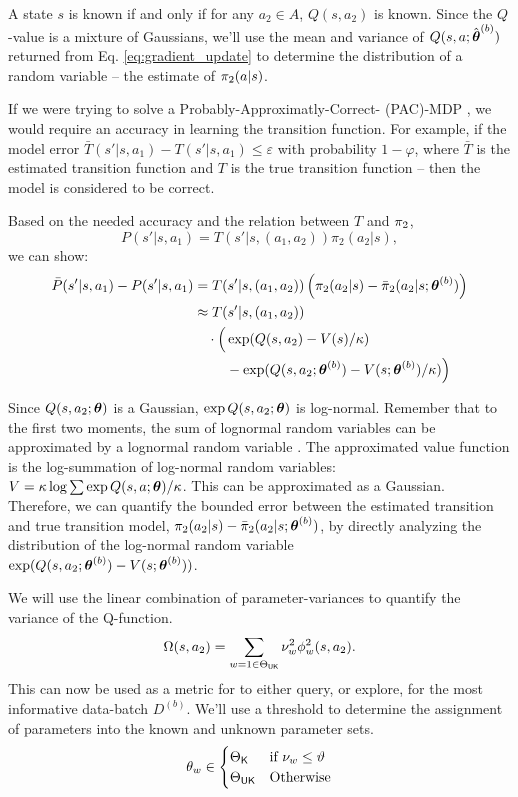 A state $s$ is known if and only if for any $a_2 \in A$, $Q(s,a_2)$ is known. Since the $Q$-value is a mixture of
Gaussians, we'll use the mean and variance of $Q(s,a;\hat{\boldsymbol{\mathbb{\theta}}}^{(b)})$ returned from Eq.
\ref{eq:gradient_update} to determine the distribution of a random variable -- the estimate of $\pi_{2}(a|s)$.

If we were trying to solve a Probably-Approximatly-Correct- (PAC)-MDP \cite{Fu-RSS-14}, we would require an accuracy
in learning the transition function. For example, if the model error $\bar T(s'|s,a_1) - T(s'|s,a_1) \le
\varepsilon$ with probability $1-\varphi$, where $\bar T$ is the estimated transition function and $T$ is the true
transition function -- then the model is considered to be correct.

Based on the needed accuracy and the relation between $T$ and $\pi_{2}$,
\[
P(s'|s,a_1) = T(s'|s,(a_1,a_2))\pi_2(a_2|s),
\]
we can show:
\begin{align*}
\bar P(s'|s,a_1)  -P(s'|s,a_1)
& = T(s'|s,(a_1,a_2))\left( \pi_2(a_2|s) - \bar \pi_2(a_2|s;\boldsymbol{\mathbb{\theta}}^{(b)})
\right)\\
& \approx T(s'|s,(a_1,a_2)) \\
& \quad \cdot \Big(\exp(Q(s,a_2)-V(s)/\kappa) \\
& \qquad\ - \exp(Q(s,a_2;\boldsymbol{\mathbb{\theta}}^{(b)})-V(s;\boldsymbol{\mathbb{\theta}}^{(b)})/\kappa) \Big)
\end{align*}

Since $Q(s,a_2;\boldsymbol{\mathbb{\theta}})$ is a Gaussian, $\exp Q(s,a_2;\boldsymbol{\mathbb{\theta}})$ is log-normal. Remember that to the first two
moments, the sum of lognormal random variables can be approximated by a lognormal random variable
\cite{fenton1960sum}.  The approximated value function is the log-summation of log-normal random variables: ${V
	=\kappa \log \sum \exp Q(s,a;\boldsymbol{\mathbb{\theta}})/\kappa}$. This can be approximated as a Gaussian. Therefore, we can quantify
the bounded error between the estimated transition and true transition model, $\pi_2(a_2|s) - \bar
\pi_2(a_2|s;\boldsymbol{\mathbb{\theta}}^{(b)})$,  by directly analyzing the distribution of the log-normal random variable\\
{\(\exp(Q(s,a_2;\boldsymbol{\mathbb{\theta}}^{(b)})-V(s;\boldsymbol{\mathbb{\theta}}^{(b)}))\)}.

We will use the linear combination of parameter-variances to quantify the variance of the Q-function.
\begin{equation}\label{eq:state_action_uncertainty}
\Omega(s,a_2)=\sum_{w=1 \in \Theta_{\mathsf{UK}}} \nu_w^2 \phi_w^2(s,a_2).
\end{equation}
This can now be used as a metric for  to either query, or explore, for the most informative data-batch
$D^{(b)}$. We'll use a threshold to determine the assignment of parameters into the known and unknown parameter sets.
\begin{equation*}
	\theta_{w} \in \begin{cases}
					\Theta_{\mathsf{K}} & \text{if}\ \nu_w \leq \vartheta \\
					\Theta_{\mathsf{UK}} & \text{Otherwise} \\
					\end{cases}
\end{equation*}

